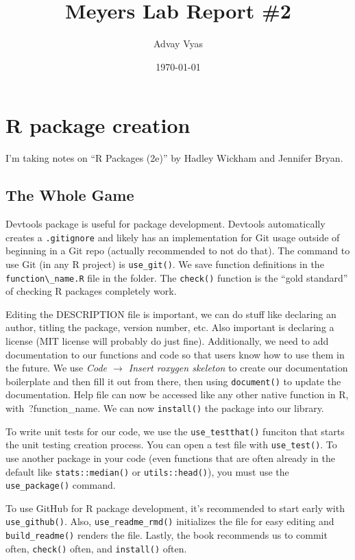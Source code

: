 \documentclass[12pt]{article}
\title{Meyers Lab Report \#2}
\author{Advay Vyas}
\date{\today}
\begin{document}
\maketitle

\tableofcontents

\section{R package creation}
I'm taking notes on ``R Packages (2e)'' by Hadley Wickham and Jennifer Bryan.

\subsection{The Whole Game}
Devtools package is useful for package development. Devtools automatically creates a \verb|.gitignore| and likely has an implementation for Git usage outside of beginning in a Git repo (actually recommended to not do that). The command to use Git (in any R project) is \verb|use_git()|. We save function definitions in the \verb|function\_name.R| file in the folder. The \verb|check()| function is the ``gold standard'' of checking R packages completely work.

Editing the DESCRIPTION file is important, we can do stuff like declaring an author, titling the package, version number, etc. Also important is declaring a license (MIT license will probably do just fine). Additionally, we need to add documentation to our functions and code so that users know how to use them in the future. We use \textit{Code $\rightarrow$ Insert roxygen skeleton} to create our documentation boilerplate and then fill it out from there, then using \verb|document()| to update the documentation. Help file can now be accessed like any other native function in R, with \,?function\_name. We can now \verb|install()| the package into our library. 

To write unit tests for our code, we use the \verb|use_testthat()| funciton that starts the unit testing creation process. You can open a test file with \verb|use_test()|. To use another package in your code (even functions that are often already in the default like \verb|stats::median()| or \verb|utils::head()|), you must use the \verb|use_package()| command. 

To use GitHub for R package development, it's recommended to start early with \verb|use_github()|. Also, \verb|use_readme_rmd()| initializes the file for easy editing and \verb|build_readme()| renders the file. Lastly, the book recommends us to commit often, \verb|check()| often, and \verb|install()| often.
\end{document}
